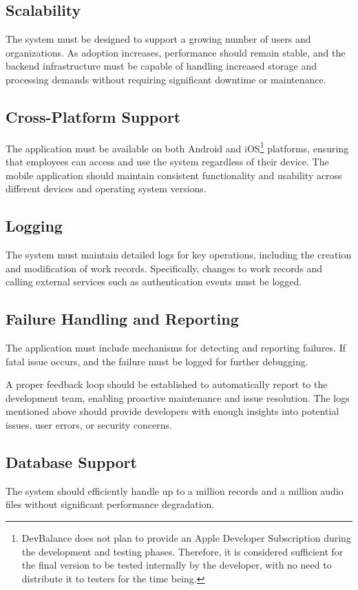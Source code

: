 \documentclass[
  digital,     %
  oneside,     %
  nosansbold,  %
  nocolorbold, %
  lof,         %
  lot,         %
]{fithesis4}
\begin{document}
\subsection{Scalability}  
The system must be designed to support a growing number of users and organizations. As adoption increases, performance should remain stable, and the backend infrastructure must be capable of handling increased storage and processing demands without requiring significant downtime or maintenance.

\subsection{Cross-Platform Support}  
The application must be available on both Android and \gls{iOS}\footnote{DevBalance does not plan to provide an Apple Developer Subscription during the development and testing phases. Therefore, it is considered sufficient for the final version to be tested internally by the developer, with no need to distribute it to testers for the time being.} platforms, ensuring that employees can access and use the system regardless of their device. The mobile application should maintain consistent functionality and usability across different devices and operating system versions.

\subsection{Logging}  
The system must maintain detailed logs for key operations, including the creation and modification of work records. Specifically, changes to work records and calling external services such as authentication events must be logged.

\subsection{Failure Handling and Reporting}  
The application must include mechanisms for detecting and reporting failures. If fatal issue occurs, and the failure must be logged for further debugging.  

A proper feedback loop should be established to automatically report to the development team, enabling proactive maintenance and issue resolution. The logs mentioned above should provide developers with enough insights into potential issues, user errors, or security concerns.

\subsection{Database Support}  
The system should efficiently handle up to a million records and a million audio files without significant performance degradation.  
\end{document}
